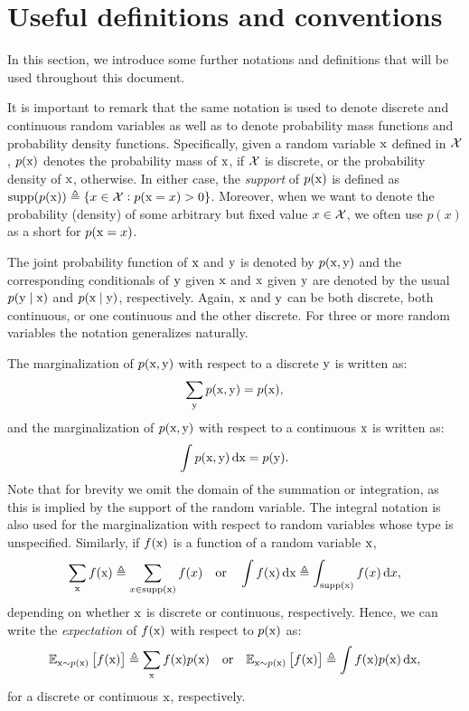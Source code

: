 \section{Useful definitions and conventions}
\label{sec:definitions}
In this section, we introduce some further notations and definitions that will be used throughout this document.

It is important to remark that the same notation is used to denote discrete and continuous random variables as well as to denote probability mass functions and probability density functions. Specifically, given a random variable ${\textnormal{x}}$ defined in ${\mathcal{X}}$, $p({\textnormal{x}})$ denotes the probability mass of ${\textnormal{x}}$, if ${\mathcal{X}}$ is discrete, or the probability density of ${\textnormal{x}}$, otherwise. In either case, the \emph{support} of $p({\textnormal{x}})$ is defined as $\mathrm{supp}(p({\textnormal{x}})) \triangleq \lbrace x \in {\mathcal{X}}: p({\textnormal{x}}=x) > 0 \rbrace$. Moreover, when we want to denote the probability (density) of some arbitrary but fixed value $x \in {\mathcal{X}}$, we often use $p(x)$ as a short for $p({\textnormal{x}}=x)$.

The joint probability function of ${\textnormal{x}}$ and ${\textnormal{y}}$ is denoted by $p({\textnormal{x}},{\textnormal{y}})$ and the corresponding conditionals of ${\textnormal{y}}$ given ${\textnormal{x}}$ and ${\textnormal{x}}$ given ${\textnormal{y}}$ are denoted by the usual $p({\textnormal{y}} \mid {\textnormal{x}})$ and $p({\textnormal{x}} \mid {\textnormal{y}})$, respectively. Again, ${\textnormal{x}}$ and ${\textnormal{y}}$ can be both discrete, both continuous, or one continuous and the other discrete. For three or more random variables the notation generalizes naturally.

The marginalization of $p({\textnormal{x}},{\textnormal{y}})$ with respect to a discrete ${\textnormal{y}}$ is written as:
\begin{equation}
  \sum_{{\textnormal{y}}} p({\textnormal{x}},{\textnormal{y}}) = p({\textnormal{x}}),
\end{equation}
and the marginalization of $p({\textnormal{x}},{\textnormal{y}})$ with respect to a continuous ${\textnormal{x}}$ is written as:
\begin{equation}
    \int p({\textnormal{x}},{\textnormal{y}}) {\,\text{d}} {\textnormal{x}} = p({\textnormal{y}}).
\end{equation}
Note that for brevity we omit the domain of the summation or integration, as this is implied by the support of the random variable. The integral notation is also used for the marginalization with respect to random variables whose type is unspecified. Similarly, if $f({\textnormal{x}})$ is a function of a random variable ${\textnormal{x}}$,
\begin{equation}
    \sum_{\textnormal{x}} f({\textnormal{x}}) \triangleq \sum_{x \in \mathrm{supp(x)}} f(x) \quad \text{or} \quad \int f({\textnormal{x}}) {\,\text{d}} {\textnormal{x}} \triangleq \int_\mathrm{supp(x)} f(x) {\,\text{d}} x,
\end{equation}
depending on whether ${\textnormal{x}}$ is discrete or continuous, respectively. Hence, we can write the \emph{expectation} of $f({\textnormal{x}})$ with respect to $p({\textnormal{x}})$ as:
\begin{equation}
    \mathbb{E}_{{\textnormal{x}} \sim p({\textnormal{x}})} \left[f({\textnormal{x}})\right] \triangleq \sum_{\textnormal{x}} f({\textnormal{x}}) p({\textnormal{x}}) \quad \text{or} \quad \mathbb{E}_{{\textnormal{x}} \sim p({\textnormal{x}})} \left[f({\textnormal{x}})\right] \triangleq \int f({\textnormal{x}}) p({\textnormal{x}}) {\,\text{d}} {\textnormal{x}},
\end{equation}
for a discrete or continuous ${\textnormal{x}}$, respectively.